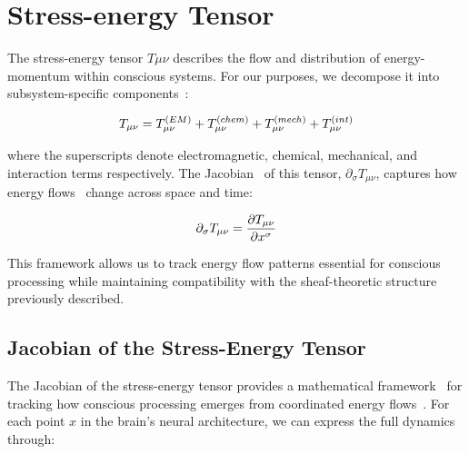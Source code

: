 \section{Stress-energy Tensor~}

The stress-energy tensor $T\mu\nu$ describes the flow and distribution of energy-momentum within conscious systems. For our purposes, we decompose it into subsystem-specific components~:

\begin{equation}
    T_{\mu\nu} = T_{\mu\nu}^{(EM)} + T_{\mu\nu}^{(chem)} + T_{\mu\nu}^{(mech)} + T_{\mu\nu}^{(int)}
    \myequation{Stress-energy tensor decomposition for conscious systems}
    \label{eq:stress_energy_decomposition}
\end{equation}

where the superscripts denote electromagnetic, chemical, mechanical, and interaction terms respectively. The Jacobian~ of this tensor, $\partial_\sigma T_{\mu\nu}$, captures how energy flows~ change across space and time:

\begin{equation}
    \partial_\sigma T_{\mu\nu} = \frac{\partial T_{\mu\nu}}{\partial x^\sigma}
    \myequation{Jacobian of the stress-energy tensor capturing energy flow changes}
    \label{eq:jacobian_stress_energy}
\end{equation}

This framework allows us to track energy flow patterns essential for conscious processing while maintaining compatibility with the sheaf-theoretic structure~ previously described.

\subsection*{Jacobian of the Stress-Energy Tensor~}

The Jacobian of the stress-energy tensor provides a mathematical framework~ for tracking how conscious processing emerges from coordinated energy flows~. For each point $x$ in the brain's neural architecture, we can express the full dynamics through:

